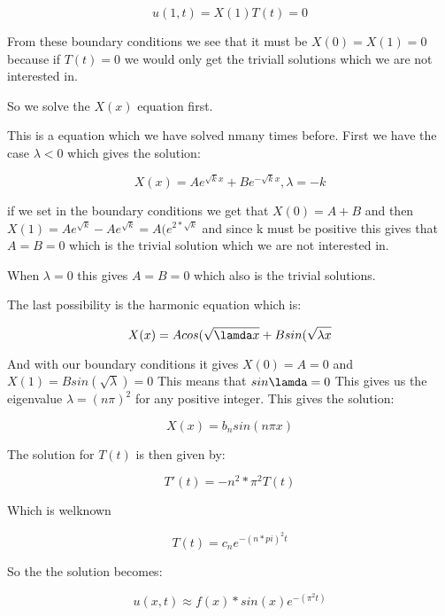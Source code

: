 \documentclass[a4paper,10pt]{article}
\begin{document}
\begin{equation}
 u(1,t) = X(1)T(t) = 0
\end{equation}

From these boundary conditions we see that it must be $X(0) = X(1) = 0$ because if $T(t)=0$ we would only get the triviall solutions which we are not interested in.

So we solve the $X(x)$ equation first.

This is a equation which we have solved nmany times before. First we have the case $\lambda < 0$ which gives the solution:

\begin{equation}
 X(x) = Ae^{\sqrt{k}x} + Be^{-\sqrt{k}x}, \lambda=-k
\end{equation}

if we set in the boundary conditions we get that $X(0) = A+B$ and then $X(1) = Ae^{\sqrt{k}} - Ae^{\sqrt{k}} = A(e^{2*\sqrt{k}}$ and since k must
be positive this gives that $A=B=0$ which is the trivial solution which we are not interested in.

When $\lambda = 0 $ this gives $A=B=0$ which also is the trivial solutions.

The last possibility is the harmonic equation which is:

\begin{equation}

 X(x) = Acos(\sqrt{\lamda x} + Bsin(\sqrt{\lambda x}
\end{equation}

And with our boundary conditions it gives $X(0) = A = 0$ and $X(1) = Bsin(\sqrt{\lambda}) = 0$
This means that $sin\lamda = 0$ This gives us the eigenvalue $\lambda = (n\pi)^2$ for any positive integer.
This gives the solution:

\begin{equation}
 X(x) = b_nsin(n\pi x)
\end{equation}

The solution for $T(t)$ is then given by:

\begin{equation}
 T'(t) = -n^2*\pi ^2 T(t)
\end{equation}

Which is welknown 

\begin{equation}
 T(t) = c_ne^{-(n*pi)^2t}
\end{equation}

So the the solution becomes:

\begin{equation}
 u(x,t) \approx f(x)*sin(x)e^{-(\pi^2t)}
 \end{equation}
\end{document}
